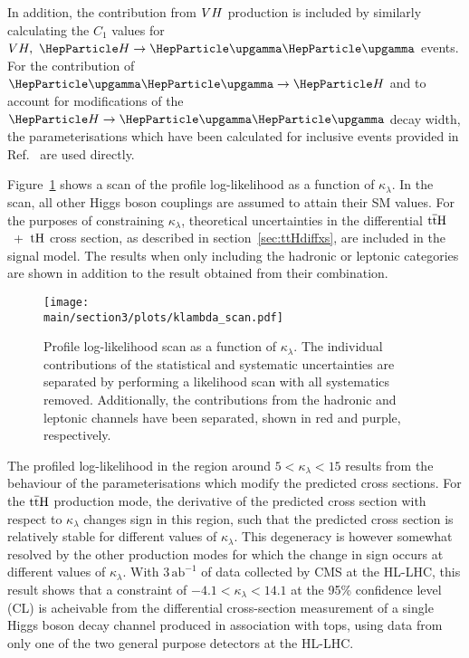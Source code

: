 In addition, the contribution from $VH$ production is included by similarly calculating the $C_{1}$ values for $\VH,~\hgg$ events. For the contribution of $\ggH$ and to account for modifications of the $\hgg$ decay width, the parameterisations which have been calculated for inclusive events provided in Ref.~\cite{Degrassi:2016wml} are used directly.

Figure~\ref{fig:ttHdiff_CMS_klambda_scan} shows a scan of the profile log-likelihood as a function of $\kappa_{\lambda}$. In the scan, all other Higgs boson couplings are assumed to attain their SM values. For the purposes of constraining $\kappa_{\lambda}$, theoretical uncertainties in the differential $\text{t}\overline{\text{t}}\text{H}$~+~$\text{tH}$ cross section, as described in section~\ref{sec:ttHdiffxs}, are included in the signal model. The results when only including the hadronic or leptonic categories are shown in addition to the result obtained from their combination. 

\begin{figure}[htb!]
        \centering
        \texttt{[image: \\main/section3/plots/klambda\_scan.pdf]}
        \caption{Profile log-likelihood scan as a function of $\kappa_\lambda$. The individual contributions of the statistical and systematic uncertainties are separated by performing a likelihood scan with all systematics removed. Additionally, the contributions from the hadronic and leptonic channels have been separated, shown in red and purple, respectively.}
        \label{fig:ttHdiff_CMS_klambda_scan}
\end{figure}


The profiled log-likelihood in the region around 
$5<\kappa_\lambda<15$ results from the behaviour of the parameterisations which modify the predicted cross sections. For the $\text{t}\overline{\text{t}}\text{H}$ production mode, the derivative of the predicted cross section with respect to $\kappa_\lambda$ changes sign in this region, such that the predicted cross section is relatively stable for different values of $\kappa_\lambda$. This degeneracy is however somewhat resolved by the  other production modes for which the change in sign occurs at different values of $\kappa_\lambda$. With $3\,\text{ab}^{-1}$ of data collected by CMS at the HL-LHC, this result shows that a constraint of $-4.1 < \kappa_\lambda < 14.1$ at the 95\% confidence level (CL) is acheivable from the differential cross-section measurement of a single Higgs boson decay channel produced in association with tops, using data from only one of the two general purpose detectors at the HL-LHC.  


